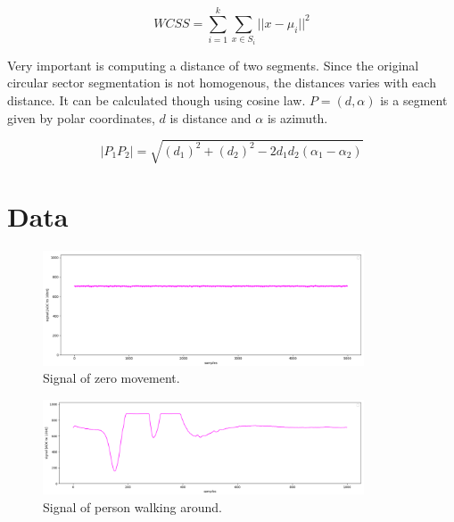 \begin{equation}
\mathit{WCSS} = \sum_{i=1}^{k} \sum_{x \in S_i} ||x - \mu_i||^2
\end{equation}

Very important is computing a distance of two segments. Since the original circular sector segmentation
is not homogenous, the distances varies with each distance. It can be calculated though using
cosine law. $P = (d, \alpha)$ is a segment given by polar coordinates, $d$ is distance and $\alpha$ is
azimuth.

\begin{equation}
|P_{1} P_{2}| = \sqrt{(d_{1})^{2} + (d_{2})^{2} - 2d_{1}d_{2}(\alpha_1 - \alpha_2)}
\end{equation}




\chapter{Data}

\begin{figure}[h!]
\begin{center}
\includegraphics[width=0.85\textwidth]{obrazky-figures/signal_calm.png}
\caption{Signal of zero movement.\label{fig:signalcalm}}
\end{center}
\end{figure}

\begin{figure}[h!]
\begin{center}
\includegraphics[width=0.85\textwidth]{obrazky-figures/signal_walk.png}
\caption{Signal of person walking around.\label{fig:signalwalk}}
\end{center}
\end{figure}

